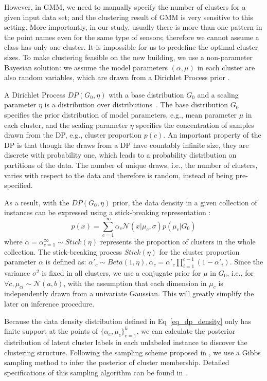 However, in GMM, we need to manually specify the number of clusters for a given input data set; and the clustering result of GMM is very sensitive to this setting. More importantly,
in our study, usually there is more than one pattern in the point names even for the same type of sensors; therefore we cannot assume a class has only one cluster. It is impossible for us to predefine the
optimal cluster sizes. To make clustering feasible on the new building, we use a non-parameter Bayesian solution: we assume the model parameters $(\alpha, \mu)$ in each cluster are also random variables, which are drawn from a Dirichlet Process prior \cite{dp}.

A Dirichlet Process $DP(G_0, \eta)$ with a base distribution $G_0$ and a scaling parameter $\eta$ is a distribution over distributions~\cite{dp}. The base distribution $G_0$ specifies the prior distribution of model parameters, e.g., mean parameter $\mu$ in each cluster, and the scaling parameter $\eta$ specifies the concentration of samples drawn from the DP, e.g., cluster proportion $p(c)$. An important property of the DP is that though the draws from a DP have countably infinite size, they are discrete with probability one, which leads to a probability distribution on partitions of the data. The number of unique draws, i.e., the number of clusters, varies with respect to the data and therefore is random, instead of being pre-specified.

As a result, with the $DP(G_{0}, \eta)$ prior, the data density in a given collection of instances can be expressed using a stick-breaking representation
\cite{sethuraman1994constructive}:
\begin{equation}\label{eq_dp_density}
p(x)=\sum_{c=1}^\infty \alpha_c \mathcal{N}(x|\mu_c,\sigma)p(\mu_c|G_0)
\end{equation}
where $\alpha={\alpha}_{c=1}^\infty\sim Stick(\eta)$ represents the proportion of clusters in the whole collection. The stick-breaking process $Stick(\eta)$ for the cluster proportion parameter $\alpha$ is defined as: $\alpha'_c\sim Beta(1, \eta), \alpha_c=\alpha'_c\prod_{i=1}^{c-1}(1-\alpha'_i)$. Since the variance $\sigma^2$ is fixed in all clusters, we use a conjugate prior for $\mu$ in $G_0$, i.e., for $\forall c, \mu_{ci}\sim \mathcal{N}(a,b)$, with the assumption that each dimension in $\mu_c$ is independently drawn from a univariate Gaussian. This will greatly simplify the later on inference procedure.

Because the data density distribution defined in Eq~\eqref{eq_dp_density} only has finite support at the points of $\{\alpha_c, \mu_c\}^k_{c=1}$, we can calculate the posterior distribution of latent cluster labels in each unlabeled instance to discover the clustering structure. Following the sampling scheme proposed in \cite{neal2000markov}, we use a Gibbs sampling method to infer the posterior of cluster membership. Detailed specifications of this sampling algorithm can be found in \cite{neal2000markov}.


